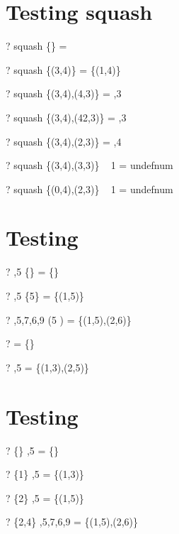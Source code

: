 \documentclass{article}
\begin{document}
\section{Testing squash}
\begin{zed} \vdash? squash \{\} = \emptyset[\nat \cross \num] \end{zed}
\begin{zed} \vdash? squash \{(3,4)\} = \{(1,4)\} \end{zed}
\begin{zed} \vdash? squash \{(3,4),(4,3)\} = ,3 \rangle \end{zed}
\begin{zed} \vdash? squash \{(3,4),(42,3)\} = ,3 \rangle \end{zed}
\begin{zed} \vdash? squash \{(3,4),(2,3)\} = ,4 \rangle \end{zed}
\begin{zed} \vdash? squash \{(3,4),(3,3)\} ~ 1 = undefnum \end{zed}
\begin{zed} \vdash? squash \{(0,4),(2,3)\} ~ 1 = undefnum \end{zed}

\section{Testing \filter}
\begin{zed} \vdash? ,5 \rangle \filter \{\} = \{\} \end{zed}
\begin{zed} \vdash? ,5 \rangle \filter \{5\} = \{(1,5)\} \end{zed}
\begin{zed} \vdash? ,5,7,6,9 \rangle \filter (5 ) = \{(1,5),(2,6)\} \end{zed}
\begin{zed} \vdash? \langle \rangle \filter \nat = \{\} \end{zed}
\begin{zed} \vdash? ,5 \rangle \filter \nat = \{(1,3),(2,5)\} \end{zed}

\section{Testing \filter}
\begin{zed} \vdash? \{\} \extract {},5 \rangle = \{\} \end{zed}
\begin{zed} \vdash? \{1\} \extract {},5 \rangle = \{(1,3)\} \end{zed}
\begin{zed} \vdash? \{2\} \extract {},5 \rangle = \{(1,5)\} \end{zed}
\begin{zed} \vdash? \{2,4\} \extract {},5,7,6,9 \rangle = \{(1,5),(2,6)\} \end{zed}
\end{document}

